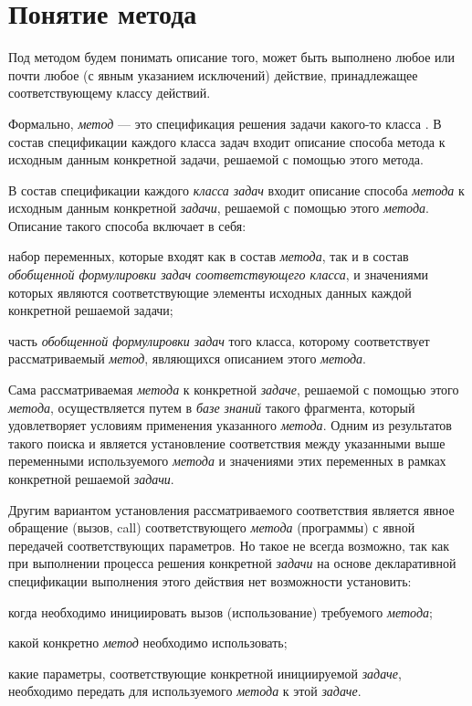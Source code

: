 \section{Понятие метода}
\label{sec_method_concept}


Под методом будем понимать описание того,  может быть выполнено любое или почти любое (с явным указанием исключений) действие, принадлежащее соответствующему классу действий.

Формально, \textit{метод} --- это спецификация решения задачи какого-то класса . В состав спецификации каждого класса задач входит описание способа  метода к исходным данным конкретной задачи, решаемой с помощью этого метода.

В состав спецификации каждого \textit{класса задач} входит описание способа  \textit{метода} к исходным данным конкретной \textit{задачи}, решаемой с помощью этого \textit{метода}. Описание такого способа  включает в себя:
\begin{textitemize}
	\item набор переменных, которые входят как в состав \textit{метода}, так и в состав \textit{обобщенной формулировки задач соответствующего класса}, и значениями которых являются соответствующие элементы исходных данных каждой конкретной решаемой задачи;
	\item часть \textit{обобщенной формулировки задач} того класса, которому соответствует рассматриваемый \textit{метод}, являющихся описанием  этого \textit{метода}.
\end{textitemize}

Сама рассматриваемая  \textit{метода} к конкретной \textit{задаче}, решаемой с помощью этого \textit{метода}, осуществляется путем  в \textit{базе знаний} такого фрагмента, который удовлетворяет условиям применения указанного \textit{метода}. Одним из результатов такого поиска и является установление соответствия между указанными выше переменными используемого \textit{метода} и значениями этих переменных в рамках конкретной решаемой \textit{задачи}.

Другим вариантом установления рассматриваемого соответствия является явное обращение (вызов, call) соответствующего \textit{метода} (программы) с явной передачей соответствующих параметров. Но такое не всегда возможно, так как при выполнении процесса решения конкретной \textit{задачи} на основе декларативной спецификации выполнения этого действия нет возможности установить:
\begin{textitemize}
	\item когда необходимо инициировать вызов (использование) требуемого \textit{метода};
	\item какой конкретно \textit{метод} необходимо использовать;
	\item какие параметры, соответствующие конкретной инициируемой \textit{задаче}, необходимо передать для  используемого \textit{метода} к этой \textit{задаче}.
\end{textitemize}

